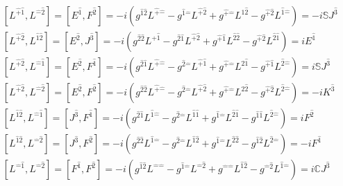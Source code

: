 \documentclass[]{article}
\numberwithin{equation}{section}
\begin{document}
\begin{align}
    &\left[L^{\hat{+}\hat{1}},L^{\hat{-}\hat{2}}\right]=\left[E^{\hat{1}},F^{\hat{2}}\right]=-i\left(g^{\hat{1}\hat{2}}L^{\hat{+}\hat{-}}-g^{\hat{1}\hat{-}}L^{\hat{+}\hat{2}}+g^{\hat{+}\hat{-}}L^{\hat{1}\hat{2}}-g^{\hat{+}\hat{2}}L^{\hat{1}\hat{-}}\right)=-i\mathbb{S}J^{\hat{3}}\\
    &\left[L^{\hat{+}\hat{2}},L^{\hat{1}\hat{2}}\right]=\left[E^{\hat{2}},J^{\hat{3}}\right]=-i\left(g^{\hat{2}\hat{2}}L^{\hat{+}\hat{1}}-g^{\hat{2}\hat{1}}L^{\hat{+}\hat{2}}+g^{\hat{+}\hat{1}}L^{\hat{2}\hat{2}}-g^{\hat{+}\hat{2}}L^{\hat{2}\hat{1}}\right)=iE^{\hat{1}}\\
    &\left[L^{\hat{+}\hat{2}},L^{\hat{-}\hat{1}}\right]=\left[E^{\hat{2}},F^{\hat{1}}\right]=-i\left(g^{\hat{2}\hat{1}}L^{\hat{+}\hat{-}}-g^{\hat{2}\hat{-}}L^{\hat{+}\hat{1}}+g^{\hat{+}\hat{-}}L^{\hat{2}\hat{1}}-g^{\hat{+}\hat{1}}L^{\hat{2}\hat{-}}\right)=i\mathbb{S}J^{\hat{3}}\\
    &\left[L^{\hat{+}\hat{2}},L^{\hat{-}\hat{2}}\right]=\left[E^{\hat{2}},F^{\hat{2}}\right]=-i\left(g^{\hat{2}\hat{2}}L^{\hat{+}\hat{-}}-g^{\hat{2}\hat{-}}L^{\hat{+}\hat{2}}+g^{\hat{+}\hat{-}}L^{\hat{2}\hat{2}}-g^{\hat{+}\hat{2}}L^{\hat{2}\hat{-}}\right)=-iK^{\hat{3}}\\
    &\left[L^{\hat{1}\hat{2}},L^{\hat{-}\hat{1}}\right]=\left[J^{\hat{3}},F^{\hat{1}}\right]=-i\left(g^{\hat{2}\hat{1}}L^{\hat{1}\hat{-}}-g^{\hat{2}\hat{-}}L^{\hat{1}\hat{1}}+g^{\hat{1}\hat{-}}L^{\hat{2}\hat{1}}-g^{\hat{1}\hat{1}}L^{\hat{2}\hat{-}}\right)=iF^{\hat{2}}\\
    &\left[L^{\hat{1}\hat{2}},L^{\hat{-}\hat{2}}\right]=\left[J^{\hat{3}},F^{\hat{2}}\right]=-i\left(g^{\hat{2}\hat{2}}L^{\hat{1}\hat{-}}-g^{\hat{2}\hat{-}}L^{\hat{1}\hat{2}}+g^{\hat{1}\hat{-}}L^{\hat{2}\hat{2}}-g^{\hat{1}\hat{2}}L^{\hat{2}\hat{-}}\right)=-iF^{\hat{1}}\\
    &\left[L^{\hat{-}\hat{1}},L^{\hat{-}\hat{2}}\right]=\left[F^{\hat{1}},F^{\hat{2}}\right]=-i\left(g^{\hat{1}\hat{2}}L^{\hat{-}\hat{-}}-g^{\hat{1}\hat{-}}L^{\hat{-}\hat{2}}+g^{\hat{-}\hat{-}}L^{\hat{1}\hat{2}}-g^{\hat{-}\hat{2}}L^{\hat{1}\hat{-}}\right)=i\mathbb{C}J^{\hat{3}}
\end{align}
\end{document}
